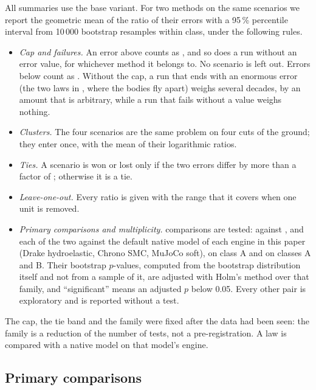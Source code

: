 All summaries use the base variant. For two methods on the same scenarios we report the
geometric mean of the ratio of their errors with a 95\,\% percentile interval from 10\,000
bootstrap resamples within class, under the following rules.
\begin{itemize}
\item \emph{Cap and failures.} An error above  counts as ,
  and so does a run without an error value, for whichever method it belongs to. No scenario is
  left out. Errors below  count as . Without the cap, a
  run that ends with an enormous error (the two laws in , where the bodies fly
  apart) weighs several decades, by an amount that is arbitrary, while a run that fails without
  a value weighs nothing.
\item \emph{Clusters.} The four  scenarios are the same problem on four cuts of
  the ground; they enter once, with the mean of their logarithmic ratios.
\item \emph{Ties.} A scenario is won or lost only if the two errors differ by more than a
  factor of ; otherwise it is a tie.
\item \emph{Leave-one-out.} Every ratio is given with the range that it covers when one
  unit is removed.
\item \emph{Primary comparisons and multiplicity.}  comparisons are tested:
   against , and each of the two against the default native
  model of each engine in this paper (Drake hydroelastic, Chrono SMC, MuJoCo soft), on class A
  and on classes A and B. Their bootstrap $p$-values, computed from the bootstrap distribution
  itself and not from a sample of it, are adjusted with Holm's method over that family, and
  ``significant'' means an adjusted $p$ below 0.05. Every other pair is exploratory and is
  reported without a test.
\end{itemize}
The cap, the tie band and the family were fixed after the data had been seen: the family is a
reduction of the number of tests, not a pre-registration. A law is compared with a native model
on that model's engine.

\subsection{Primary comparisons}


